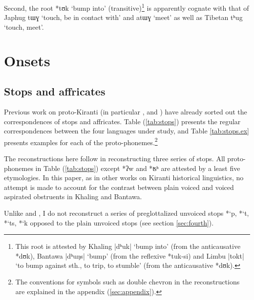\documentclass[oneside,a4paper,11pt]{article}
\newcommand{\ipa}[1]{{\phon\mbox{#1}}} %
\newcommand{\dhatu}[2]{|\ipa{#1}| `#2'}
\begin{document}
Second,  the root *\ipa{tʊk} `bump into' (transitive)\footnote{This root is attested by Khaling \dhatu{dʰuk}{bump into} (from the anticausative  *\ipa{dʊk}), Bantawa  \dhatu{dʰuŋs}{bump} (from the reflexive *\ipa{tuk-si}) and Limbu \dhatu{tokt}{to bump against sth., to trip, to stumble}  (from the anticausative  *\ipa{dʊk}).} is apparently cognate with that of Japhug \ipa{tɯɣ} `touch, be in contact with' and \ipa{atɯɣ} `meet' as well as Tibetan \ipa{tʰug} `touch, meet'.

\section{Onsets} \label{sec:onsets}

\subsection{Stops and affricates} \label{sec:stops}

Previous work on proto-Kiranti (in particular \citealt{starostin94kiranti}, \citealt{michailovsky94stops} and \citealt{opgenort05jero}) have already sorted out the correspondences of stops and affricates. Table (\ref{tab:stops}) presents the regular correspondences between the four languages under study, and Table \ref{tab:stops.ex} presents examples for each of the proto-phonemes.\footnote{The conventions for symbols such as double chevron in the reconstructions are explained in the appendix (\ref{sec:appendix}).}


The reconstructions here follow \citet{michailovsky94stops} in reconstructing three series of stops.  All proto-phonemes in Table (\ref{tab:stops}) except *\ipa{ʔw} and *\ipa{ʦʰ} are attested by a least five etymologies. In this paper, as in other works on Kiranti historical linguistics, no attempt is made to account for the contrast between plain voiced and voiced aspirated obstruents in Khaling and Bantawa.

Unlike \citet{starostin94kiranti} and \citet{opgenort05jero}, I do not reconstruct a series of preglottalized unvoiced stops *\ipa{`p},  *\ipa{`t},  *\ipa{`ts},  *\ipa{`k} opposed to the plain unvoiced stops (see section \ref{sec:fourth}). 
\end{document}
